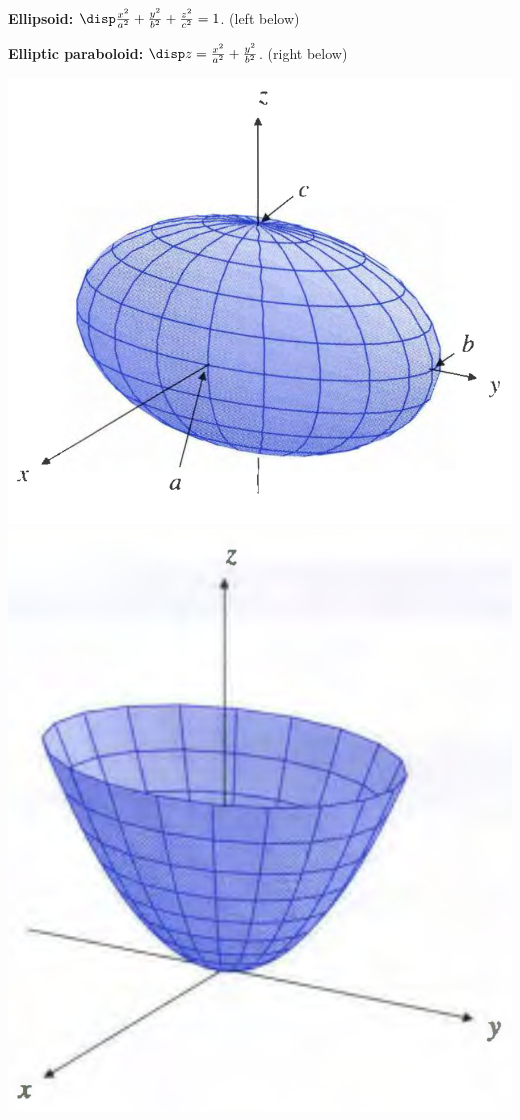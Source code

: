 \begin{spacing}{1.3}
    {\bf Ellipsoid:} $\disp \frac{x^2}{a^2}+\frac{y^2}{b^2}+\frac{z^2}{c^2}=1$. (left below)

    {\bf Elliptic paraboloid:} $\disp z=\frac{x^2}{a^2}+\frac{y^2}{b^2}$. (right below)

    \begin{center}
        \includegraphics[scale=0.3]{images/Ch10-ellipsoid.png}
        \hspace{1in}
        \includegraphics[scale=0.3]{images/Ch10-elliptic-paraboloid.png}
    \end{center}


\end{spacing}
